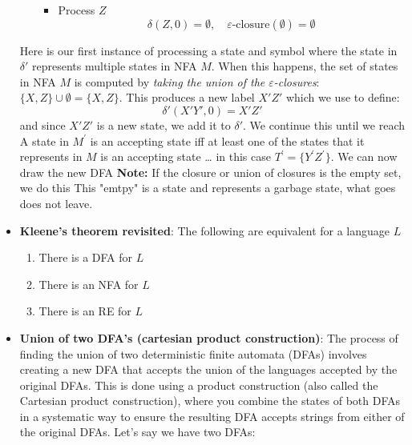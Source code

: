 \documentclass{report}
\begin{document}
\begin{itemize}
\begin{itemize}
\begin{itemize}
                \item Process $Z$
                    \[
                        \delta(Z, 0) = \emptyset, \quad \varepsilon\text{-closure}(\emptyset) = \emptyset
                    \]
            \end{itemize}
    \end{itemize}
    Here is our first instance of processing a state and symbol where the state in $\delta'$ represents multiple states in NFA $M$. When this happens, the set of states in NFA $M$ is computed by \textit{taking the union of the $\varepsilon$-closures}: $\{X, Z\} \cup \emptyset = \{X, Z\}$.
    \bigbreak \noindent 
    This produces a new label $X'Z'$ which we use to define:
    \[
        \delta'(X'Y', 0) = X'Z'
    \]
    and since $X'Z'$ is a new state, we add it to $\delta'$.
    \bigbreak \noindent 
    We continue this until we reach 
    \bigbreak \noindent 
    \bigbreak \noindent 
    A state in $M^{\prime}$ is an accepting state iff at least one of the states that it represents in $M$ is an accepting state … in this case $T^{\prime}= \{Y^{\prime}Z^{\prime}\}$.
    \bigbreak \noindent 
    We can now draw the new DFA 
    \bigbreak \noindent 
    \bigbreak \noindent 
    \textbf{Note:} If the closure or union of closures is the empty set, we do this
    \bigbreak \noindent 
    \bigbreak \noindent 
    This "emtpy" is a state and represents a garbage state, what goes does not leave.
\item \textbf{Kleene's theorem revisited}: The following are equivalent for a language $L$
    \begin{enumerate}
        \item There is a DFA for $L$
        \item There is an NFA for $L$
        \item There is an RE for $L$
    \end{enumerate}
    \item \textbf{Union of two DFA's (cartesian product construction)}:
        The process of finding the union of two deterministic finite automata (DFAs) involves creating a new DFA that accepts the union of the languages accepted by the original DFAs. This is done using a product construction (also called the Cartesian product construction), where you combine the states of both DFAs in a systematic way to ensure the resulting DFA accepts strings from either of the original DFAs.
        \bigbreak \noindent 
        Let’s say we have two DFAs:

\end{itemize}
\end{document}
